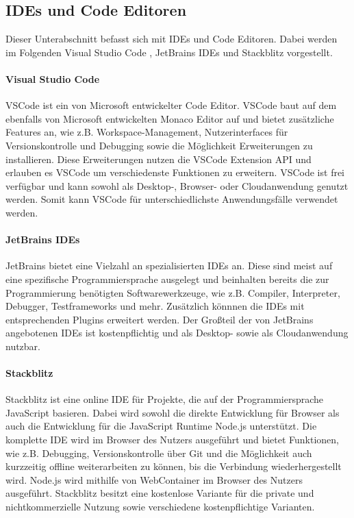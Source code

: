 \subsection{IDEs und Code Editoren}\label{section:stand-der-technik:weitere-entwicklungen:ides-und-code-editoren}

Dieser Unterabschnitt befasst sich mit IDEs und Code Editoren. Dabei werden im Folgenden Visual Studio Code \cite{noauthor_vscode_nodate}, JetBrains IDEs \cite{noauthor_jetbrains_nodate} und Stackblitz \cite{noauthor_stackblitz_nodate} vorgestellt.

\paragraph{Visual Studio Code}
\acf{VSCode} \cite{noauthor_vscode_nodate} ist ein von Microsoft \cite{noauthor_microsoft_nodate} entwickelter Code Editor. \ac{VSCode} baut auf dem ebenfalls von Microsoft entwickelten Monaco Editor \cite{noauthor_monaco_nodate} auf und bietet zusätzliche Features an, wie z.B. Workspace-Management, Nutzerinterfaces für Versionskontrolle und Debugging sowie die Möglichkeit Erweiterungen zu installieren. Diese Erweiterungen nutzen die VSCode Extension API \cite{noauthor_vscode-extension-api_nodate} und erlauben es \ac{VSCode} um verschiedenste Funktionen zu erweitern. \ac{VSCode} ist frei verfügbar und kann sowohl als Desktop-, Browser- oder Cloudanwendung genutzt werden. Somit kann \ac{VSCode} für unterschiedlichste Anwendungsfälle verwendet werden.

\paragraph{JetBrains IDEs}
JetBrains \cite{noauthor_jetbrains_nodate} bietet eine Vielzahl an spezialisierten IDEs an. Diese sind meist auf eine spezifische Programmiersprache ausgelegt und beinhalten bereits die zur Programmierung benötigten Softwarewerkzeuge, wie z.B. Compiler, Interpreter, Debugger, Testframeworks und mehr. Zusätzlich könnnen die IDEs mit entsprechenden Plugins \cite{noauthor_jetbrains-plugins_nodate} erweitert werden. Der Großteil der von JetBrains angebotenen IDEs ist kostenpflichtig und als Desktop- sowie als Cloudanwendung nutzbar.

\paragraph{Stackblitz}
Stackblitz \cite{noauthor_stackblitz_nodate} ist eine online IDE für Projekte, die auf der Programmiersprache JavaScript basieren. Dabei wird sowohl die direkte Entwicklung für Browser als auch die Entwicklung für die JavaScript Runtime Node.js \cite{noauthor_nodejs_nodate} unterstützt. Die komplette IDE wird im Browser des Nutzers ausgeführt und bietet Funktionen, wie z.B. Debugging, Versionskontrolle über Git und die Möglichkeit auch kurzzeitig offline weiterarbeiten zu können, bis die Verbindung wiederhergestellt wird. Node.js wird mithilfe von WebContainer \cite{noauthor_webcontainer_nodate} im Browser des Nutzers ausgeführt. Stackblitz besitzt eine kostenlose Variante für die private und nichtkommerzielle Nutzung sowie verschiedene kostenpflichtige Varianten.

